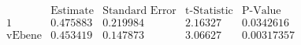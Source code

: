 \[\begin{array}{l|llll}
 \text{} & \text{Estimate} & \text{Standard Error} & \text{t-Statistic} & \text{P-Value} \\
\hline
 1 & 0.475883 & 0.219984 & 2.16327 & 0.0342616 \\
 \text{vEbene} & 0.453419 & 0.147873 & 3.06627 & 0.00317357 \\
\end{array}\]

